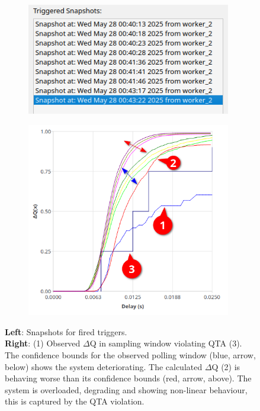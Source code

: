         \begin{figure}[H]
            \centering
            \begin{subfigure}{.5\textwidth}
                \centering
                \includegraphics[width=0.98\textwidth]{img/overload_2/snapshots.png}
                \label{fig:high_load_1}
            \end{subfigure}%
            \begin{subfigure}{.5\textwidth}
                \centering
                \includegraphics[width =0.98\textwidth]{img/overload_2/qta_triggerd2.png}
                \label{fig:high_load_2}
            \end{subfigure}
            \caption{\textbf{Left}: Snapshots for fired triggers. \\
            \textbf{Right}: (1) Observed $\Delta$Q in sampling window violating QTA (3). The confidence bounds for the observed polling window (blue, arrow, below) shows the system deteriorating. The calculated $\Delta$Q (2) is behaving worse than its confidence bounds (red, arrow, above). The system is overloaded, degrading and showing non-linear behaviour, this is captured by the QTA violation.} %
            \label{fig:qta_viol_1}
        \end{figure}
